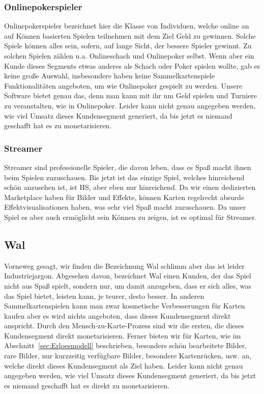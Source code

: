 \documentclass[fontsize=12, a4aper]{scrartcl}
\begin{document}
\subsubsection{Onlinepokerspieler} \label{subsubsec:Professioneller_Spieler_Onlinepokerspieler}

Onlinepokerspieler bezeichnet hier die Klasse von Individuen, welche online an auf Können basierten Spielen teilnehmen mit dem Ziel Geld zu gewinnen. Solche Spiele können alles sein, sofern, auf lange Sicht, der bessere Spieler gewinnt. Zu solchen Spielen zählen u.a. Onlineschach und Onlinepoker selbst. Wenn aber ein Kunde dieses Segments etwas anderes als Schach oder Poker spielen wollte, gab es keine große Auswahl, insbesondere haben keine Sammelkartenspiele Funktionalitäten angeboten, um wie Onlinepoker gespielt zu werden. Unsere Software bietet genau das, denn man kann mit ihr um Geld spielen und Turniere zu veranstalten, wie in Onlinepoker. Leider kann nicht genau angegeben werden, wie viel Umsatz dieses Kundensegment generiert, da bis jetzt es niemand geschafft hat es zu monetarisieren.

\subsubsection{Streamer} \label{subsubsec:Professioneller Spieler_Streamer}

Streamer sind professionelle Spieler, die davon leben, dass es Spaß macht ihnen beim Spielen zuzuschauen. Bis jetzt ist das einzige Spiel, welches hinreichend schön anzusehen ist, ist \acl{HS}, aber eben nur hinreichend. Da wir einen dedizierten Marketplace haben für Bilder und Effekte, können Karten regelrecht absurde Effektvisualisationen haben, was sehr viel Spaß macht zuzuschauen. Da unser Spiel es aber auch ermöglicht sein Können zu zeigen, ist es optimal für Streamer.

\subsection{Wal} \label{subsec:Wal}

Vorneweg gesagt, wir finden die Bezeichnung \glqq Wal\grqq{} schlimm aber das ist leider Industriejargon. Abgesehen davon, bezeichnet \glqq Wal\grqq{} einen Kunden, der das Spiel nicht aus Spaß spielt, sondern nur, um damit anzugeben, dass er sich alles, was das Spiel bietet, leisten kann, je teurer, desto besser. In anderen Sammelkartenspielen kann man zwar kosmetische Verbesserungen für Karten kaufen aber es wird nichts angeboten, dass dieses Kundensegment direkt anspricht. Durch den \glqq Mensch-zu-Karte-Prozess\grqq{} sind wir die ersten, die dieses Kundensegment direkt monetarisieren. Ferner bieten wir für Karten, wie im Abschnitt~\ref{sec:Erloesmodell} beschrieben, besonders schön bearbeitete Bilder, rare Bilder, nur kurzzeitig verfügbare Bilder, besondere Kartenrücken, usw. an, welche direkt dieses Kundensegment als Ziel haben. Leider kann nicht genau angegeben werden, wie viel Umsatz dieses Kundensegment generiert, da bis jetzt es niemand geschafft hat es direkt zu monetarisieren.
\end{document}
